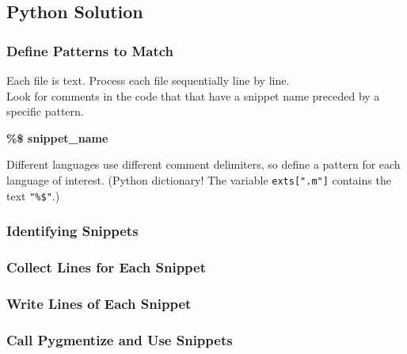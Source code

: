 \subsection{Python Solution}
\begin{frame}[fragile]
\frametitle{Define Patterns to Match}
Each file is text.  Process each file 
sequentially line by line.
\\[1em]
Look for comments in the code that
that have a snippet name preceded by a 
specific pattern.
\begin{center}
{\bf \%\$ snippet\_name}
\end{center}
Different languages use different comment
delimiters, so define a pattern
for each language of interest.
(Python dictionary!  
The variable \verb|exts[".m"]|
contains the text \verb|"%$"|.)
\end{frame}

\begin{frame}
\frametitle{Identifying Snippets}
\end{frame}

\begin{frame}
\frametitle{Collect Lines for Each Snippet}
\end{frame} 

\begin{frame}
\frametitle{Write Lines of Each Snippet}
\end{frame}

\begin{frame}
\frametitle{Call Pygmentize and Use Snippets}
\end{frame}
